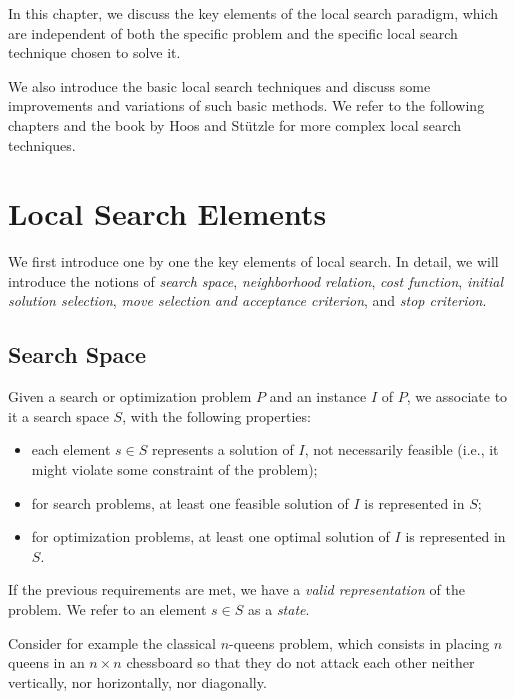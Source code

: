 In this chapter, we discuss the key elements of the local
search paradigm, which are independent of both the specific problem 
and the specific local search technique chosen to solve it.

We also introduce the basic local search techniques and discuss some
improvements and variations of such basic methods. We refer to
the following chapters %
and the book by Hoos and St\"utzle \cite{HoSt05} for more complex local search
techniques. %



\section{Local Search Elements}

We first introduce one by one the key elements of local search.  In
detail, we will introduce the notions of \emph{search space},
\emph{neighborhood relation}, \emph{cost function}, \emph{initial
  solution selection}, \emph{move selection and acceptance criterion},
and \emph{stop criterion}.

\subsection{Search Space}

Given a search or optimization problem $P$ and an instance $I$ of $P$, we
associate to it a search space $S$, with the following properties:

\begin{itemize}
\item each element $s\in S$ represents a solution of $I$, not
  necessarily feasible (i.e., it might violate some constraint of the problem);
\item for search problems, at least one feasible solution of $I$ is
  represented in $S$;
\item for optimization problems, at least one optimal solution of $I$
  is represented in $S$.
\end{itemize}

If the previous requirements are met, we have a \emph{valid
  representation} of the problem. We refer to an element $s\in S$ as a
\emph{state}.

Consider for example the classical $n$-queens problem, which consists
in placing $n$ queens in an $n\times n$ chessboard so that they do not
attack each other neither vertically, nor horizontally, nor diagonally.

